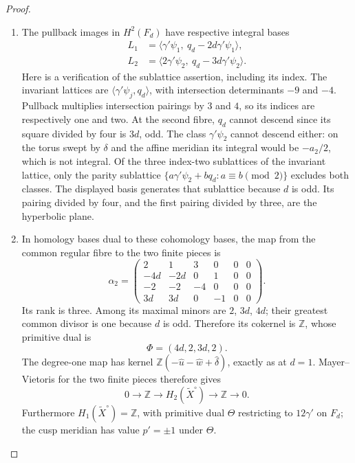 \begin{proof}
\begin{enumerate}[label=\arabic*.,leftmargin=*]
\item The pullback images in $H^2(F_d)$ have respective integral bases
\[
 \begin{aligned}
 L_1&=\langle\gamma'\psi_1,\ q_d-2d\gamma'\psi_1\rangle,\\
 L_2&=\langle2\gamma'\psi_2,\ q_d-3d\gamma'\psi_2\rangle.
 \end{aligned}
\]
Here is a verification of the sublattice assertion, including its
index. The invariant lattices are
$\langle\gamma'\psi_j,q_d\rangle$, with intersection determinants
$-9$ and $-4$. Pullback multiplies intersection pairings by $3$ and
$4$, so its indices are respectively one and two. At the second
fibre, $q_d$ cannot descend since its square divided by four is
$3d$, odd. The class $\gamma'\psi_2$ cannot descend either: on the
torus swept by $\delta$ and the affine meridian its integral would
be $-a_2/2$, which is not integral. Of the three index-two sublattices
of the invariant lattice, only the parity sublattice
$\{a\gamma'\psi_2+bq_d:a\equiv b\pmod2\}$ excludes both classes.
The displayed basis generates that sublattice because $d$ is odd.
Its pairing divided by four, and the first pairing divided by three,
are the hyperbolic plane.

\item In homology bases dual to these cohomology bases, the map from the
common regular fibre to the two finite pieces is
\[
 \alpha_2=
 \begin{pmatrix}
 2&1&3&0&0&0\\
 -4d&-2d&0&1&0&0\\
 -2&-2&-4&0&0&0\\
 3d&3d&0&-1&0&0
 \end{pmatrix}.
\]
Its rank is three. Among its maximal minors are $2$, $3d$, $4d$;
their greatest common divisor is one because $d$ is odd. Therefore
its cokernel is $\mathbb Z$, whose primitive dual is
\[
 \Phi=(4d,2,3d,2).
\]
The degree-one map has kernel
$\mathbb Z(-\widehat u-\widehat w+\widehat\delta)$, exactly as at
$d=1$. Mayer--Vietoris for the two finite pieces therefore gives
\[
 0\longrightarrow\mathbb Z\longrightarrow H_2(\widetilde X^\circ)
 \longrightarrow\mathbb Z\longrightarrow0.
\]
Furthermore $H_1(\widetilde X^\circ)=\mathbb Z$, with primitive dual
$\Theta$ restricting to $12\gamma'$ on $F_d$; the cusp meridian
has value $p'=\pm1$ under $\Theta$.


\end{enumerate}
\end{proof}
